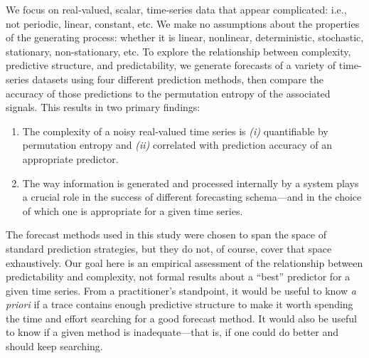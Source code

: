 We focus on real-valued, scalar, time-series data that appear
complicated: i.e., not periodic, linear, constant, etc.  We make no
assumptions about the properties of the generating process: whether it
is linear, nonlinear, deterministic, stochastic, stationary,
non-stationary, etc.
To explore the relationship between complexity, predictive structure,
and predictability, we generate forecasts of a variety of time-series
datasets using four different prediction methods, then compare the
accuracy of those predictions to the permutation entropy of the
associated signals.  This results in two primary findings:
\begin{enumerate}
\item The complexity of a noisy real-valued time series is {\sl (i)}
  quantifiable by permutation entropy and {\sl (ii)} correlated with prediction
  accuracy of an appropriate predictor.
\item The way information is generated and processed internally by a
  system plays a crucial role in the success of different forecasting
  schema---and in the choice of which one is appropriate for a given 
time series.
\end{enumerate}
The forecast methods used in this study were chosen to span the space of
standard prediction strategies, but they do not, of course, cover that space
exhaustively.  Our goal here is an empirical assessment of the
relationship between predictability and complexity, not formal results
about a ``best'' predictor for a given time series.  From a
practitioner's standpoint, it would be useful to know {\sl a priori}
if a trace contains enough predictive structure to make it worth
spending the time and effort searching for a good forecast method.  It
would also be useful to know if a given method is inadequate---that
is, if one could do better and should keep searching.


